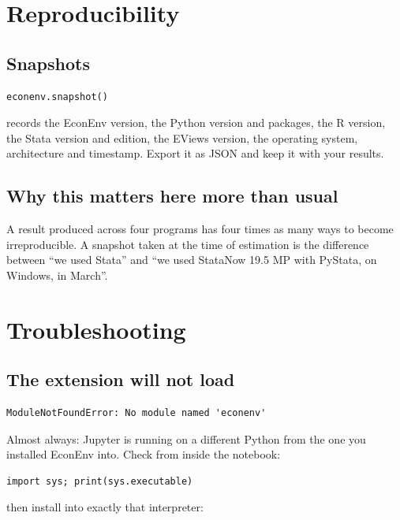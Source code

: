 \documentclass[11pt,a4paper]{report}
\begin{document}
\chapter{Reproducibility}

\section{Snapshots}

\begin{lstlisting}
econenv.snapshot()
\end{lstlisting}

records the EconEnv version, the Python version and packages, the R version,
the Stata version and edition, the EViews version, the operating system,
architecture and timestamp. Export it as JSON and keep it with your results.

\section{Why this matters here more than usual}

A result produced across four programs has four times as many ways to become
irreproducible. A snapshot taken at the time of estimation is the difference
between ``we used Stata'' and ``we used StataNow 19.5 MP with PyStata, on
Windows, in March''.

\chapter{Troubleshooting}

\section{The extension will not load}
\label{sec:wrongpython}

\begin{lstlisting}
ModuleNotFoundError: No module named 'econenv'
\end{lstlisting}

Almost always: Jupyter is running on a different Python from the one you
installed EconEnv into. Check from inside the notebook:

\begin{lstlisting}
import sys; print(sys.executable)
\end{lstlisting}

then install into exactly that interpreter:
\end{document}
